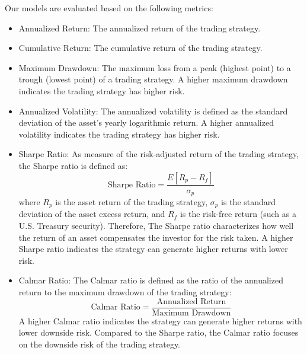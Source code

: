 \documentclass[conference]{IEEEtran}
\begin{document}
Our models are evaluated based on the following metrics:
\begin{itemize}
  \item Annualized Return: The annualized return of the trading strategy.
  \item Cumulative Return: The cumulative return of the trading strategy.
  \item Maximum Drawdown: The maximum loss from a peak (highest point) to a trough (lowest point) of a trading strategy. A higher maximum drawdown indicates the trading strategy has higher risk.
  \item Annualized Volatility: The annualized volatility is defined as the standard deviation of the asset's yearly logarithmic return. A higher annualized volatility indicates the trading strategy has higher risk.
  \item Sharpe Ratio: As measure of the risk-adjusted return of the trading strategy, the Sharpe ratio is defined as:
    \begin{equation}
      \text{Sharpe Ratio} = \frac{E[R_p - R_f]}{\sigma_p}
    \end{equation}
    where $R_p$ is the asset return of the trading strategy, $\sigma_p$ is the standard deviation of the asset excess return, and $R_f$ is the risk-free return (such as a U.S. Treasury security). Therefore, The Sharpe ratio characterizes how well the return of an asset compensates the investor for the risk taken. A higher Sharpe ratio indicates the strategy can generate higher returns with lower risk.
  \item Calmar Ratio:
    The Calmar ratio is defined as the ratio of the annualized return to the maximum drawdown of the trading strategy:
    \begin{equation}
      \text{Calmar Ratio} = \frac{\text{Annualized Return}}{\text{Maximum Drawdown}}
    \end{equation}
    A higher Calmar ratio indicates the strategy can generate higher returns with lower downside risk. Compared to the Sharpe ratio, the Calmar ratio focuses on the downside risk of the trading strategy.


\end{itemize}
\end{document}
